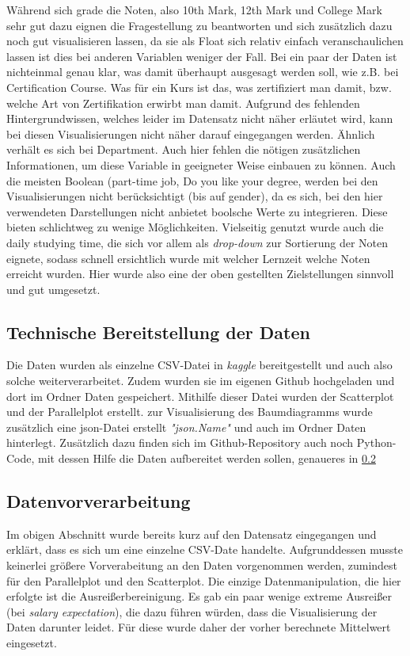 \documentclass[usegeometry=true]{scrartcl}
\begin{document}
Während sich grade die Noten, also 10th Mark, 12th Mark und College Mark sehr gut dazu eignen die Fragestellung zu beantworten und sich zusätzlich dazu noch gut visualisieren lassen, da sie als Float sich relativ einfach veranschaulichen lassen ist dies bei anderen Variablen weniger der Fall. Bei ein paar der Daten ist nichteinmal genau klar, was damit überhaupt ausgesagt werden soll, wie z.B. bei Certification Course. Was für ein Kurs ist das,  was zertifiziert man damit, bzw. welche Art von Zertifikation erwirbt man damit. Aufgrund des fehlenden Hintergrundwissen, welches leider im Datensatz nicht näher erläutet wird, kann bei diesen Visualisierungen nicht näher darauf eingegangen werden. Ähnlich verhält es sich bei Department. Auch hier fehlen die nötigen zusätzlichen Informationen, um diese Variable in geeigneter Weise einbauen zu können.
Auch die meisten Boolean (part-time job, Do you like your degree,  werden bei den Visualisierungen nicht berücksichtigt (bis auf gender), da es sich, bei den hier verwendeten Darstellungen nicht anbietet boolsche Werte zu integrieren. Diese bieten schlichtweg zu wenige Möglichkeiten.
Vielseitig genutzt wurde auch die daily studying time, die sich vor allem als \textit{drop-down} zur Sortierung der Noten eignete, sodass schnell ersichtlich wurde mit welcher Lernzeit welche Noten erreicht wurden. 
Hier wurde also eine der oben gestellten Zielstellungen sinnvoll und gut umgesetzt.

\subsection{Technische Bereitstellung der Daten}
\label{Bereitstellung}

Die Daten wurden als einzelne CSV-Datei in \textit{kaggle} bereitgestellt und auch also solche weiterverarbeitet. 
Zudem wurden sie im eigenen Github hochgeladen und dort im Ordner Daten gespeichert. Mithilfe dieser Datei wurden der Scatterplot und der Parallelplot erstellt. zur Visualisierung des Baumdiagramms wurde zusätzlich eine json-Datei erstellt \textit{"json.Name"} und auch im Ordner Daten hinterlegt. Zusätzlich dazu finden sich im Github-Repository auch noch Python-Code, mit dessen Hilfe die Daten aufbereitet werden sollen, genaueres in \ref{Datenvorverarbeitung}


\subsection{Datenvorverarbeitung}
\label{Datenvorverarbeitung}
Im obigen Abschnitt wurde bereits kurz auf den Datensatz eingegangen und erklärt, dass es sich um eine einzelne CSV-Date handelte. Aufgrunddessen musste keinerlei größere Vorverabeitung an den Daten vorgenommen werden, zumindest für den Parallelplot und den Scatterplot. Die einzige Datenmanipulation, die hier erfolgte ist die Ausreißerbereinigung. Es gab ein paar wenige extreme Ausreißer (bei \textit{salary expectation}), die dazu führen würden, dass die Visualisierung der Daten darunter leidet. Für diese wurde daher der vorher berechnete Mittelwert eingesetzt.\\
\end{document}
